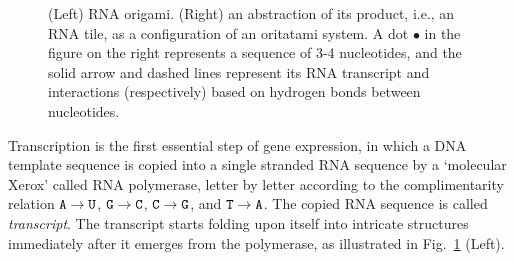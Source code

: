 \documentclass[runningheads]{llncs}
\begin{document}
\begin{figure}[htb]
\begin{minipage}{0.3\linewidth}
{}

\end{minipage}
\caption{
(Left) RNA origami. 
(Right) an abstraction of its product, i.e., an RNA tile, as a configuration of an oritatami system. A dot $\bullet$ in the figure on the right represents a sequence of 3-4 nucleotides, and the solid arrow and dashed lines represent its RNA transcript and interactions (respectively) based on hydrogen bonds between nucleotides.
}
\label{fig:rna_origami}
\end{figure}

Transcription is the first essential step of gene expression, in which a DNA template sequence is copied into a single stranded RNA sequence by a `molecular Xerox' called RNA polymerase, letter by letter according to the complimentarity relation ${\tt A} \rightarrow {\tt U}$, ${\tt G} \rightarrow {\tt C}$, ${\tt C} \rightarrow {\tt G}$, and ${\tt T} \rightarrow {\tt A}$. 
The copied RNA sequence is called \textit{transcript}. 
The transcript starts folding upon itself into intricate structures immediately after it emerges from the polymerase, as illustrated in Fig.~\ref{fig:rna_origami} (Left). 
\end{document}
